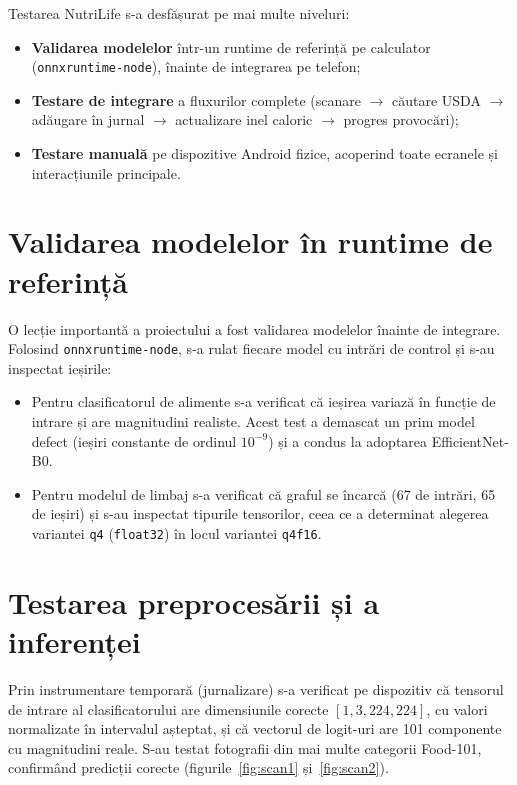 \documentclass[12pt, a4paper, twoside]{report}
\numberwithin{equation}{section}
\begin{document}
Testarea NutriLife s-a desfășurat pe mai multe niveluri:
\begin{itemize}
  \item \textbf{Validarea modelelor} într-un runtime de referință pe calculator
    (\texttt{onnxruntime-node}), înainte de integrarea pe telefon;
  \item \textbf{Testare de integrare} a fluxurilor complete (scanare $\rightarrow$ căutare
    USDA $\rightarrow$ adăugare în jurnal $\rightarrow$ actualizare inel caloric $\rightarrow$
    progres provocări);
  \item \textbf{Testare manuală} pe dispozitive Android fizice, acoperind toate ecranele și
    interacțiunile principale.
\end{itemize}

\section{Validarea modelelor în runtime de referință}

O lecție importantă a proiectului a fost validarea modelelor înainte de integrare. Folosind
\texttt{onnxruntime-node}, s-a rulat fiecare model cu intrări de control și s-au inspectat
ieșirile:
\begin{itemize}
  \item Pentru clasificatorul de alimente s-a verificat că ieșirea variază în funcție de
    intrare și are magnitudini realiste. Acest test a demascat un prim model defect (ieșiri
    constante de ordinul $10^{-9}$) și a condus la adoptarea EfficientNet-B0.
  \item Pentru modelul de limbaj s-a verificat că graful se încarcă (67 de intrări, 65 de
    ieșiri) și s-au inspectat tipurile tensorilor, ceea ce a determinat alegerea variantei
    \texttt{q4} (\texttt{float32}) în locul variantei \texttt{q4f16}.
\end{itemize}

\section{Testarea preprocesării și a inferenței}

Prin instrumentare temporară (jurnalizare) s-a verificat pe dispozitiv că tensorul de intrare
al clasificatorului are dimensiunile corecte $[1, 3, 224, 224]$, cu valori normalizate în
intervalul așteptat, și că vectorul de logit-uri are 101 componente cu magnitudini reale.
S-au testat fotografii din mai multe categorii Food-101, confirmând predicții corecte
(figurile~\ref{fig:scan1} și~\ref{fig:scan2}).
\end{document}

